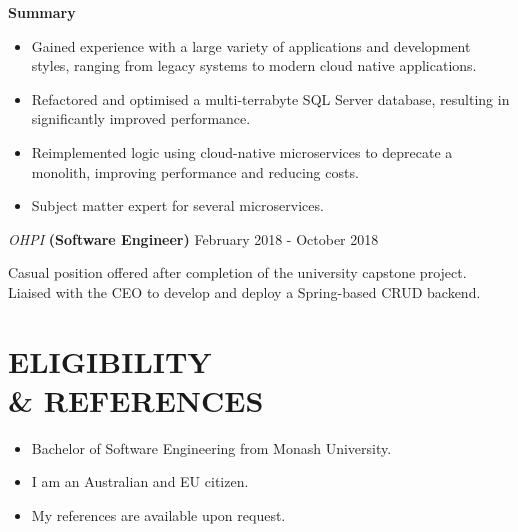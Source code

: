 \documentclass[margin, 11pt]{style}
\begin{document}
\begin{resume}
\textbf{Summary}
\begin{itemize}
\item Gained experience with a large variety of applications and development styles, ranging from legacy systems to modern cloud native applications.
\item Refactored and optimised a multi-terrabyte SQL Server database, resulting in significantly improved performance.
\item Reimplemented logic using cloud-native microservices to deprecate a monolith, improving performance and reducing costs.
\item Subject matter expert for several microservices.
\end{itemize}

\vspace{15pt}
{\sl OHPI} \textbf{(Software Engineer)} \hfill February 2018 - October 2018

Casual position offered after completion of the university capstone project. Liaised with the CEO to develop and deploy a Spring-based CRUD backend.

\section{ELIGIBILITY \\ \& REFERENCES}

\begin{itemize}
\item Bachelor of Software Engineering from Monash University.
\item I am an Australian and EU citizen.
\item My references are available upon request.
\end{itemize}

\end{resume}
\end{document}
